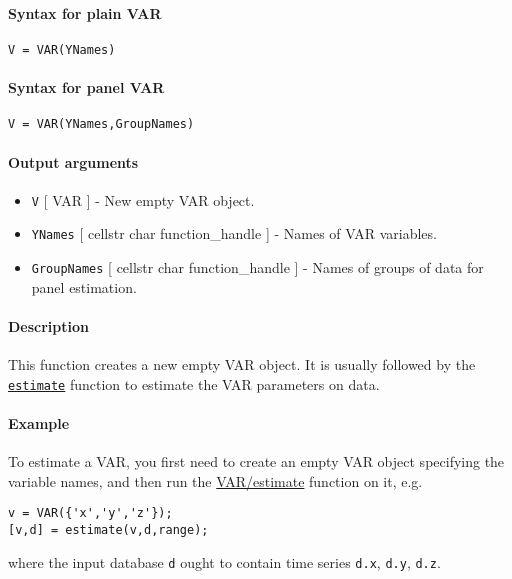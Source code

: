 


	\paragraph{Syntax for plain VAR}\label{syntax-for-plain-var}

\begin{verbatim}
V = VAR(YNames)
\end{verbatim}

\paragraph{Syntax for panel VAR}\label{syntax-for-panel-var}

\begin{verbatim}
V = VAR(YNames,GroupNames)
\end{verbatim}

\paragraph{Output arguments}\label{output-arguments}

\begin{itemize}
\item
  \texttt{V} {[} VAR {]} - New empty VAR object.
\item
  \texttt{YNames} {[} cellstr \textbar{} char \textbar{}
  function\_handle {]} - Names of VAR variables.
\item
  \texttt{GroupNames} {[} cellstr \textbar{} char \textbar{}
  function\_handle {]} - Names of groups of data for panel estimation.
\end{itemize}

\paragraph{Description}\label{description}

This function creates a new empty VAR object. It is usually followed by
the \href{VAR/estimate}{\texttt{estimate}} function to estimate the VAR
parameters on data.

\paragraph{Example}\label{example}

To estimate a VAR, you first need to create an empty VAR object
specifying the variable names, and then run the \url{VAR/estimate}
function on it, e.g.

\begin{verbatim}
v = VAR({'x','y','z'});
[v,d] = estimate(v,d,range);
\end{verbatim}

where the input database \texttt{d} ought to contain time series
\texttt{d.x}, \texttt{d.y}, \texttt{d.z}.


